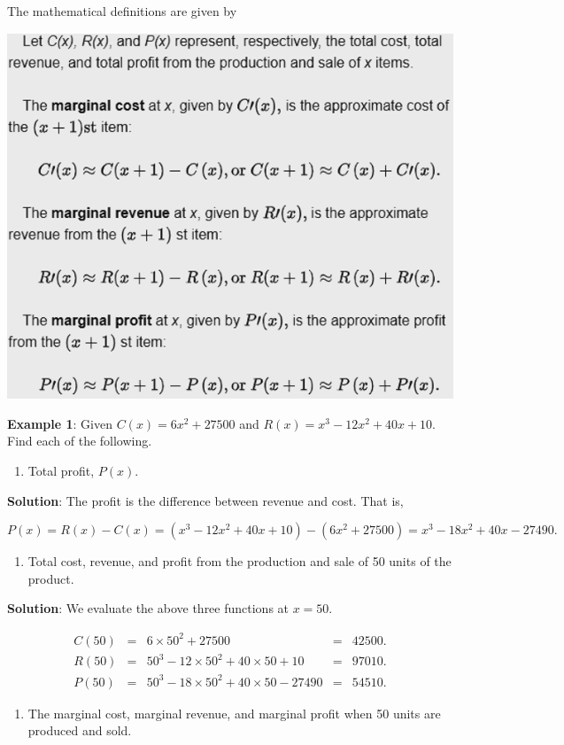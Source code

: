 \documentclass[
]{book}
\providecommand{\tightlist}{%
  \setlength{\itemsep}{0pt}\setlength{\parskip}{0pt}}
\begin{document}
The mathematical definitions are given by

\begin{center}\includegraphics[width=0.5\linewidth]{img10/w10-marginalAnalysisDef} \end{center}

\textbf{Example 1}: Given \(C(x) = 6x^2 + 27500\) and \(R(x) = x^3 - 12x^2 + 40x + 10\). Find each of the following.

\begin{enumerate}
\def\labelenumi{\arabic{enumi}.}
\tightlist
\item
  Total profit, \(P(x)\).
\end{enumerate}

\textbf{Solution}: The profit is the difference between revenue and cost. That is,

\[
P(x) = R(x) - C(x) = ( x^3 - 12x^2 + 40x + 10) - (6x^2 + 27500) = x^3-18x^2 + 40x -27490.
\]

\begin{enumerate}
\def\labelenumi{\arabic{enumi}.}
\setcounter{enumi}{1}
\tightlist
\item
  Total cost, revenue, and profit from the production and sale of 50 units of the product.
\end{enumerate}

\textbf{Solution}: We evaluate the above three functions at \(x = 50\).

\[
\begin{array}{lclcl}
C(50) & = & 6\times 50^2 + 27500 & = &42500. \\
R(50) & = & 50^3 - 12\times 50^2 + 40\times 50 + 10 & = & 97010. \\
P(50) & = & 50^3-18\times 50^2 + 40\times 50 -27490 & = & 54510.
\end{array}
\]

\begin{enumerate}
\def\labelenumi{\arabic{enumi}.}
\setcounter{enumi}{2}
\tightlist
\item
  The marginal cost, marginal revenue, and marginal profit when 50 units are produced and sold.
\end{enumerate}
\end{document}
